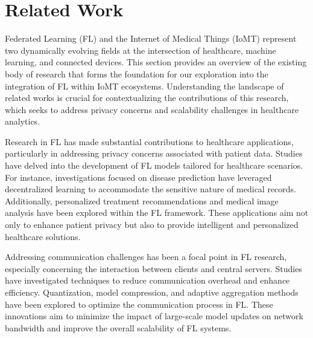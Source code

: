 \documentclass[conference]{IEEEtran}
\begin{document}
\section{Related Work}
Federated Learning (FL) and the Internet of Medical Things (IoMT)\cite{4}  represent two dynamically evolving fields at the intersection of healthcare, machine learning, and connected devices. This section provides an overview of the existing body of research that forms the foundation for our exploration into the integration of FL within IoMT ecosystems. Understanding the landscape of related works is crucial for contextualizing the contributions of this research, which seeks to address privacy concerns and scalability challenges in healthcare analytics.


Research in FL has made substantial contributions to healthcare applications, particularly in addressing privacy concerns associated with patient data. Studies have delved into the development of FL models tailored for healthcare scenarios. For instance, investigations focused on disease prediction have leveraged decentralized learning to accommodate the sensitive nature of medical records.\cite{5} Additionally, personalized treatment recommendations and medical image analysis have been explored within the FL framework. These applications aim not only to enhance patient privacy but also to provide intelligent and personalized healthcare solutions.


Addressing communication challenges has been a focal point in FL research, especially concerning the interaction between clients and central servers. Studies have investigated techniques to reduce communication\cite{6} overhead and enhance efficiency. Quantization, model compression, and adaptive aggregation methods have been explored to optimize the communication process in FL. These innovations aim to minimize the impact of large-scale model updates on network bandwidth and improve the overall scalability of FL systems.

\end{document}
